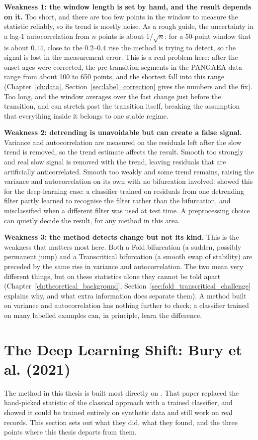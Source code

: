 \textbf{Weakness 1: the window length is set by hand, and the result depends on it.} Too short, and there are too few points in the window to measure the statistic reliably, so its trend is mostly noise. As a rough guide, the uncertainty in a lag-1 autocorrelation from $n$ points is about $1/\sqrt{n}$: for a 50-point window that is about $0.14$, close to the $0.2$--$0.4$ rise the method is trying to detect, so the signal is lost in the measurement error. This is a real problem here: after the onset ages were corrected, the pre-transition segments in the PANGAEA data range from about 100 to 650 points, and the shortest fall into this range (Chapter~\ref{ch:data}, Section~\ref{sec:label_correction} gives the numbers and the fix). Too long, and the window averages over the fast change just before the transition, and can stretch past the transition itself, breaking the assumption that everything inside it belongs to one stable regime.

\textbf{Weakness 2: detrending is unavoidable but can create a false signal.} Variance and autocorrelation are measured on the residuals left after the slow trend is removed, so the trend estimate affects the result. Smooth too strongly and real slow signal is removed with the trend, leaving residuals that are artificially anticorrelated. Smooth too weakly and some trend remains, raising the variance and autocorrelation on its own with no bifurcation involved. \citet{dablander2022} showed this for the deep-learning case: a classifier trained on residuals from one detrending filter partly learned to recognise the filter rather than the bifurcation, and misclassified when a different filter was used at test time. A preprocessing choice can quietly decide the result, for any method in this area.

\textbf{Weakness 3: the method detects change but not its kind.} This is the weakness that matters most here. Both a Fold bifurcation (a sudden, possibly permanent jump) and a Transcritical bifurcation (a smooth swap of stability) are preceded by the same rise in variance and autocorrelation. The two mean very different things, but on these statistics alone they cannot be told apart (Chapter~\ref{ch:theoretical_background}, Section~\ref{sec:fold_transcritical_challenge} explains why, and what extra information does separate them). A method built on variance and autocorrelation has nothing further to check; a classifier trained on many labelled examples can, in principle, learn the difference.

\section{The Deep Learning Shift: Bury et al. (2021)}
\label{sec:bury2021}
The method in this thesis is built most directly on \citet{bury2021}. That paper replaced the hand-picked statistic of the classical approach with a trained classifier, and showed it could be trained entirely on synthetic data and still work on real records. This section sets out what they did, what they found, and the three points where this thesis departs from them.

